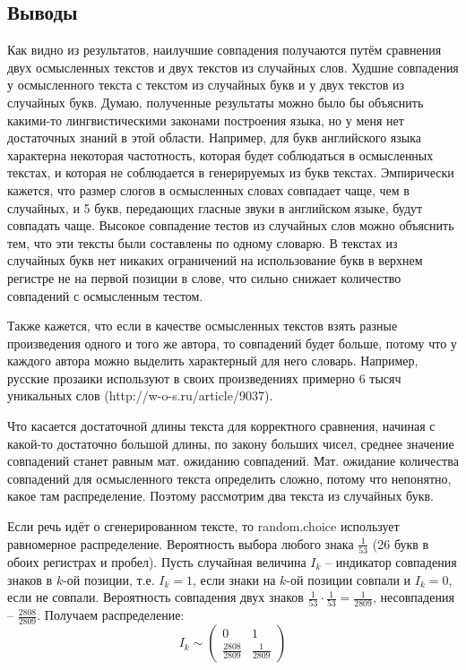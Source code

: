 \documentclass[12pt]{article}
\begin{document}
\subsection*{Выводы}
Как видно из результатов, наилучшие совпадения получаются путём сравнения двух осмысленных текстов и двух текстов из случайных слов. Худшие совпадения у осмысленного текста с текстом из случайных букв и у двух текстов из случайных букв. Думаю, полученные результаты можно было бы объяснить какими-то лингвистическими законами построения языка, но у меня нет достаточных знаний в этой области. Например, для букв английского языка характерна некоторая частотность, которая будет соблюдаться в осмысленных текстах, и которая не соблюдается в генерируемых из букв текстах. Эмпирически кажется, что размер слогов в осмысленных словах совпадает чаще, чем в случайных, и 5 букв, передающих гласные звуки в английском языке, будут совпадать чаще. Высокое совпадение тестов из случайных слов можно объяснить тем, что эти тексты были составлены по одному словарю. В текстах из случайных букв нет никаких ограничений на использование букв в верхнем регистре не на первой позиции в слове, что сильно снижает количество совпадений с осмысленным тестом.
\par Также кажется, что если в качестве осмысленных текстов взять разные произведения одного и того же автора, то совпадений будет больше, потому что у каждого автора можно выделить характерный для него словарь. Например, русские прозаики используют в своих произведениях примерно 6 тысяч уникальных слов (http://w-o-s.ru/article/9037). 
\par Что касается достаточной длины текста для корректного сравнения, начиная с какой-то достаточно большой длины, по закону больших чисел, среднее значение совпадений станет равным мат. ожиданию совпадений. Мат. ожидание количества совпадений для осмысленного текста определить сложно, потому что непонятно, какое там распределение. Поэтому рассмотрим два текста из случайных букв. 
\par Если речь идёт о сгенерированном тексте, то random.choice использует равномерное распределение. Вероятность выбора любого знака $\frac{1}{53}$ (26 букв в обоих регистрах и пробел). Пусть случайная величина $I_{k}$ -- индикатор совпадения знаков в $k$-ой позиции, т.е. $I_{k} = 1$, если знаки на $k$-ой позиции совпали и $I_{k} = 0$, если не совпали. Вероятность совпадения
двух знаков $\frac{1}{53} \cdot \frac{1}{53} = \frac{1}{2809}$, несовпадения -- $\frac{2808}{2809}$. Получаем распределение:
\begin{equation*}
I_{k} \sim
\begin{pmatrix}
0 & 1\\
\frac{2808}{2809} & \frac{1}{2809}
\end{pmatrix}
\end{equation*}
\end{document}
